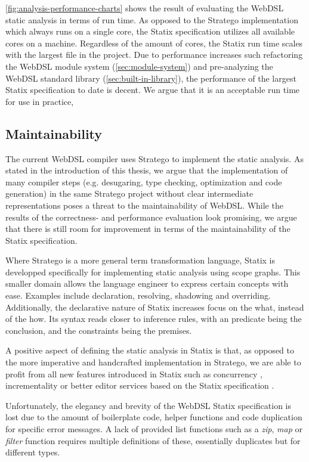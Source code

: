     \cref{fig:analysis-performance-charts} shows the result of evaluating the WebDSL static analysis in terms of run time. As opposed to the Stratego implementation which always runs on a single core, the Statix specification utilizes all available cores on a machine. Regardless of the amount of cores, the Statix run time scales with the largest file in the project. Due to performance increases such refactoring the WebDSL module system (\cref{sec:module-system}) and pre-analyzing the WebDSL standard library (\cref{sec:built-in-library}), the performance of the largest Statix specification to date is decent. We argue that it is an acceptable run time for use in practice, 

  \subsection{Maintainability}

    The current WebDSL compiler uses Stratego to implement the static analysis. As stated in the introduction of this thesis, we argue that the implementation of many compiler steps (e.g. desugaring, type checking, optimization and code generation) in the same Stratego project without clear intermediate representations poses a threat to the maintainability of WebDSL. While the results of the correctness- and performance evaluation look promising, we argue that there is still room for improvement in terms of the maintainability of the Statix specification.
    
    Where Stratego is a more general term transformation language, Statix is developped specifically for implementing static analysis using scope graphs. This smaller domain allows the language engineer to express certain concepts with ease. Examples include declaration, resolving, shadowing and overriding. Additionally, the declarative nature of Statix increases focus on the what, instead of the how. Its syntax reads closer to inference rules, with an predicate being the conclusion, and the constraints being the premises.

    A positive aspect of defining the static analysis in Statix is that, as opposed to the more imperative and handcrafted implementation in Stratego, we are able to profit from all new features introduced in Statix such as concurrency \autocite{AntwerpenV21}, incrementality \autocite{ZwaanAV22} or better editor services based on the Statix specification \autocite{PelsmaekerAV19}.

    Unfortunately, the elegancy and brevity of the WebDSL Statix specification is lost due to the amount of boilerplate code, helper functions and code duplication for specific error messages. A lack of provided list functions such as a \textit{zip}, \textit{map} or \textit{filter} function requires multiple definitions of these, essentially duplicates but for different types.

